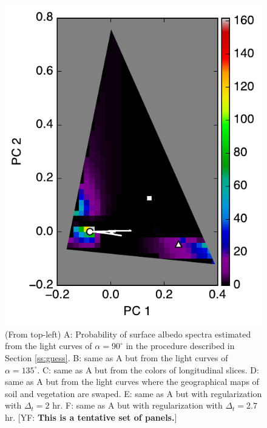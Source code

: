 \documentclass[iop,numberedappendix,apj,]{emulateapj}
\def\memoYF#1{\color{red}[YF: {\bf #1}]\color{black}}
\begin{document}
\begin{figure}[tbh!]
\begin{minipage}{0.33\hsize}
\begin{center}
\includegraphics[width=\hsize]{mockdata_90deg_3types_t12_lc_reg_l40deg.pdf}
    \end{center}
     \end{minipage}
    \caption{(From top-left) A: Probability of surface albedo spectra estimated from the light curves of $\alpha = 90^{\circ }$ in the procedure described in Section \ref{ss:guess}. B: same as A but from the light curves of  $\alpha = 135^{\circ }$. C: same as A but from the colors of longitudinal slices.  D: same as A but from the light curves where the geographical maps of soil and vegetation are swaped. E: same as A but with regularization with $\Delta_ t = 2$ hr. F: same as A but with regularization with $\Delta_ t = 2.7$ hr. \memoYF{This is a tentative set of panels.} }
\label{fig:noreg}
\end{figure}
\end{document}
